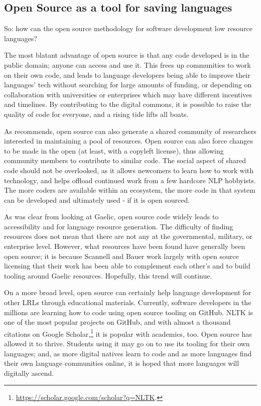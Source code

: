 \subsection{Open Source as a tool for saving languages}

So: how can the open source methodology for software development low resource languages?

The most blatant advantage of open source is that any code developed is in the public domain; anyone can access and use it. This frees up communities to work on their own code, and leads to language developers being able to improve their languages' tech without searching for large amounts of funding, or depending on collaboration with universities or enterprises which may have different incentives and timelines. By contributing to the digital commons, it is possible to raise the quality of code for everyone, and a rising tide lifts all boats.

As \citet{streiter2006implementing} recommends, open source can also generate a shared community of researchers interested in maintaining a pool of resources. Open source can also force changes to be made in the open (at least, with a copyleft license), thus allowing community members to contribute to similar code. The social aspect of shared code should not be overlooked, as it allows newcomers to learn how to work with technology, and helps offload continued work from a few hardcore NLP hobbyists. The more coders are available within an ecosystem, the more code in that system can be developed and ultimately used - if it is open sourced.

As was clear from looking at Gaelic, open source code widely leads to accessibility and for language resource generation. The difficulty of finding resources does not mean that there are not any at the governmental, military, or enterprise level. However, what resources have been found have generally been open source; it is because Scannell and Bauer work largely with open source licensing that their work has been able to complement each other's and to build tooling around Gaelic resources. Hopefully, this trend will continue.

On a more broad level, open source can certainly help language development for other LRLs through educational materials. Currently, software developers in the millions are learning how to code using open source tooling on GitHub. NLTK is one of the most popular projects on GitHub, and with almost a thousand citations on Google Scholar,\footnote{\href{https://scholar.google.com/scholar?q=NLTK}{https://scholar.google.com/scholar?q=NLTK}. } it is popular with academics, too. Open source has allowed it to thrive. Students using it may go on to use its tooling for their own languages; and, as more digital natives learn to code and as more languages find their own language communities online, it is hoped that more languages will digitally ascend.

